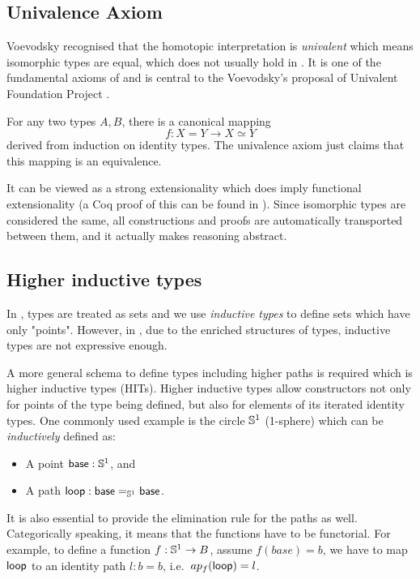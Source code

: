\subsection{Univalence Axiom}\label{uaintro}

Voevodsky recognised that the homotopic interpretation is \emph{univalent} which means isomorphic types are equal, which does not usually hold in \itt. 
It is one of the fundamental axioms of \hott and is central to the Voevodsky's proposal of Univalent Foundation Project \cite{vv_uf}. 

For any two types $A, B$, there is a canonical mapping $$f : X = Y \to X \simeq Y$$ derived from induction on identity types. The univalence axiom just claims that this mapping is an equivalence. 


It can be viewed as a strong extensionality which does imply functional extensionality (a Coq proof of this can be found in \cite{uafe}). 
Since isomorphic types are considered the same, all constructions and proofs are automatically transported between them, and it actually makes reasoning abstract.


\subsection{Higher inductive types}\label{HITs}

In \itt, types are treated as sets and we use \emph{inductive types} to define sets which have only "points". However, in \hott, due to the enriched structures of types, inductive types are not expressive enough.

A more general schema to define types including higher paths is required which is higher inductive types (HITs). Higher inductive types allow constructors not only for points of the type being defined, but also for elements of its iterated identity types.
One commonly used example is the circle $\Sn^1$ (1-sphere) which can be \emph{inductively} defined as:

\begin{itemize}
\item A point $\base:\Sn^1$, and
\item A path $\lloop : {\id[\Sn^1]\base\base}$.
\end{itemize}

It is also essential to provide the elimination rule for the paths as well. Categorically speaking, it means that the functions have to be functorial. For example, to define a function $f :\Sn^1 \rightarrow B$, assume $f(base)=b$, we have to map $\lloop$ to an identity path $l : b = b$, i.e.\ $ap_{f}(\lloop)=l$.


